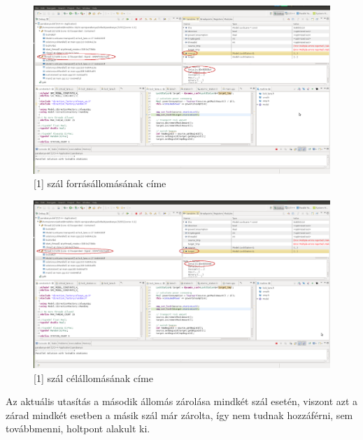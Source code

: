 \documentclass[a4paper,10pt]{article}
\begin{document}
	\begin{figure}[h]
		\begin{center}
			\includegraphics[scale=0.23]{03.png}
			\caption{[1] szál forrásállomásának címe}
		\end{center}
	\end{figure}
	
	\begin{figure}[h]
		\begin{center}
			\includegraphics[scale=0.23]{04.png}
			\caption{[1] szál célállomásának címe}
		\end{center}
	\end{figure}

Az aktuális utasítás a második állomás zárolása mindkét szál esetén, viszont azt a zárad mindkét esetben a másik szál már zárolta, így nem tudnak hozzáférni, sem továbbmenni, holtpont alakult ki.
\end{document}
